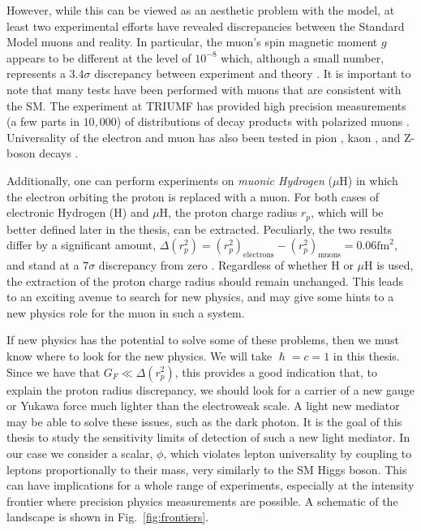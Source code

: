 However, while this can be viewed as an aesthetic problem with the model, at least two experimental efforts have revealed discrepancies between the Standard Model muons and reality.
In particular, the muon's spin magnetic moment $g$ appears to be different at the level of $10^{-8}$ which, although a small number, represents a $3.4\sigma$ discrepancy between experiment and theory \cite{2007PhLB..649..173H}.
It is important to note that many tests have been performed with muons that are consistent with the SM.
The \twist experiment at TRIUMF has provided high precision measurements (a few parts in $10,000$) of distributions of decay products with polarized muons \cite{Bayes:2011zza}.
Universality of the electron and muon has also been tested in pion \cite{Czapek:1993kc}, kaon \cite{Antonelli:2008jg}, and Z-boson decays \cite{Alexander:1991qw}.

Additionally, one can perform experiments on \emph{muonic Hydrogen} ($\mu\textrm{H}$) in which the electron orbiting the proton is replaced with a muon.
For both cases of electronic Hydrogen (H) and $\mu\textrm{H}$, the proton charge radius $r_p$, which will be better defined later in the thesis, can be extracted.
Peculiarly, the two results differ by a significant amount, $\Delta(r_p^2) = (r_p^2)_{\textrm{electrons}} - (r_p^2)_{\textrm{muons}} = 0.06\textrm{fm}^2$, and stand at a $7\sigma$ discrepancy from zero \cite{Carlson:2015jba}.
Regardless of whether H or $\mu\textrm{H}$ is used, the extraction of the proton charge radius should remain unchanged.
This leads to an exciting avenue to search for new physics, and may give some hints to a new physics role for the muon in such a system.

If new physics has the potential to solve some of these problems, then we must know where to look for the new physics.
We will take $\hslash = c = 1$ in this thesis.
Since we have that $G_F \ll \Delta(r_p^2)$, this provides a good indication that, to explain the proton radius discrepancy, we should look for a carrier of a new gauge or Yukawa force much lighter than the electroweak scale.
A light new mediator may be able to solve these issues, such as the dark photon.
It is the goal of this thesis to study the sensitivity limits of detection of such a new light mediator.
In our case we consider a scalar, $\phi$, which violates lepton universality by coupling to leptons proportionally to their mass, very similarly to the SM Higgs boson.
This can have implications for a whole range of experiments, especially at the intensity frontier where precision physics measurements are possible.
A schematic of the landscape is shown in Fig.\ \ref{fig:frontiers}.

